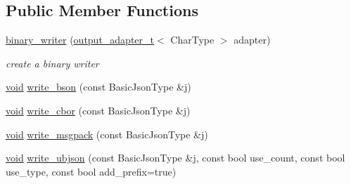 \subsection*{Public Member Functions}
\begin{DoxyCompactItemize}
\item 
\hyperlink{classnlohmann_1_1detail_1_1binary__writer_a373289af95a946c19bb4a58a5df71a78}{binary\+\_\+writer} (\hyperlink{namespacenlohmann_1_1detail_a9b680ddfb58f27eb53a67229447fc556}{output\+\_\+adapter\+\_\+t}$<$ Char\+Type $>$ adapter)
\begin{DoxyCompactList}\small\item\em create a binary writer \end{DoxyCompactList}\item 
\hyperlink{namespacenlohmann_1_1detail_a59fca69799f6b9e366710cb9043aa77d}{void} \hyperlink{classnlohmann_1_1detail_1_1binary__writer_a9ffc566db5219b473762462234b47db9}{write\+\_\+bson} (const Basic\+Json\+Type \&j)
\item 
\hyperlink{namespacenlohmann_1_1detail_a59fca69799f6b9e366710cb9043aa77d}{void} \hyperlink{classnlohmann_1_1detail_1_1binary__writer_aa0ab8d27fd88a33a2f801413ac4c7fbc}{write\+\_\+cbor} (const Basic\+Json\+Type \&j)
\item 
\hyperlink{namespacenlohmann_1_1detail_a59fca69799f6b9e366710cb9043aa77d}{void} \hyperlink{classnlohmann_1_1detail_1_1binary__writer_ae4e0852b64102ce4b07d99f08f828b7c}{write\+\_\+msgpack} (const Basic\+Json\+Type \&j)
\item 
\hyperlink{namespacenlohmann_1_1detail_a59fca69799f6b9e366710cb9043aa77d}{void} \hyperlink{classnlohmann_1_1detail_1_1binary__writer_a0f6c65053d859269f88eb4ebb0cd7060}{write\+\_\+ubjson} (const Basic\+Json\+Type \&j, const bool use\+\_\+count, const bool use\+\_\+type, const bool add\+\_\+prefix=true)
\end{DoxyCompactItemize}
